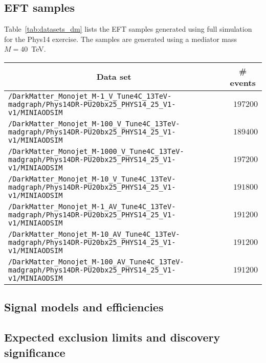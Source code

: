 \subsection{EFT samples}
Table~\ref{tab:datasets_dm} lists the EFT samples generated using full simulation for the Phys14 exercise. The samples are generated using a mediator mass $M=40$~TeV.
\begin{sidewaystable}[h]
    \centering
    \caption{EFT dark matter samples for axial-vector and axial couplings using a mediator mass $M=40$~TeV \label{tab:datasets_dm}}
    \begin{tabular}{lr}
      \hline\hline
      \multicolumn{1}{c}{Data set}&\multicolumn{1}{c}{\# events}\tabularnewline
      \hline
      {\footnotesize \verb!/DarkMatter_Monojet_M-1_V_Tune4C_13TeV-madgraph/Phys14DR-PU20bx25_PHYS14_25_V1-v1/MINIAODSIM!   } &$197200$\tabularnewline
      {\footnotesize \verb!/DarkMatter_Monojet_M-100_V_Tune4C_13TeV-madgraph/Phys14DR-PU20bx25_PHYS14_25_V1-v1/MINIAODSIM! } &$189400$\tabularnewline
      {\footnotesize \verb!/DarkMatter_Monojet_M-1000_V_Tune4C_13TeV-madgraph/Phys14DR-PU20bx25_PHYS14_25_V1-v1/MINIAODSIM!} &$197200$\tabularnewline
      {\footnotesize \verb!/DarkMatter_Monojet_M-10_V_Tune4C_13TeV-madgraph/Phys14DR-PU20bx25_PHYS14_25_V1-v1/MINIAODSIM!  } &$191800$\tabularnewline
      {\footnotesize \verb!/DarkMatter_Monojet_M-1_AV_Tune4C_13TeV-madgraph/Phys14DR-PU20bx25_PHYS14_25_V1-v1/MINIAODSIM!  } &$191200$\tabularnewline
      {\footnotesize \verb!/DarkMatter_Monojet_M-10_AV_Tune4C_13TeV-madgraph/Phys14DR-PU20bx25_PHYS14_25_V1-v1/MINIAODSIM! } &$191200$\tabularnewline
      {\footnotesize \verb!/DarkMatter_Monojet_M-100_AV_Tune4C_13TeV-madgraph/Phys14DR-PU20bx25_PHYS14_25_V1-v1/MINIAODSIM!} &$191200$\tabularnewline
\hline
\end{tabular}
\end{sidewaystable}


\subsection{Signal models and efficiencies}
\label{subsec:darkmatter_models}


\subsection{Expected exclusion limits and discovery significance}
\label{subsec:darkmatter_results}


